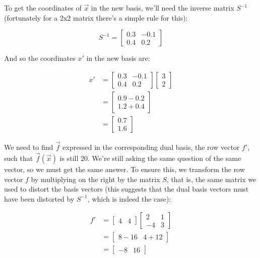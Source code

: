 To get the coordinates of $\vec{x}$ in the new basis, we'll need the inverse matrix $S^{-1}$ (fortunately for a 2x2 matrix there's a simple rule for this):

$$
S^{-1} = \begin{bmatrix}
    0.3 & -0.1 \\
    0.4 & 0.2
\end{bmatrix}
$$

And so the coordinates $x'$ in the new basis are:

\begin{equation}
\begin{split}
x' &= \begin{bmatrix}
    0.3 & -0.1 \\
    0.4 & 0.2
\end{bmatrix} \begin{bmatrix}
    3 \\ 2
\end{bmatrix} \\
  &= \begin{bmatrix}
    0.9 - 0.2 \\ 1.2 + 0.4
\end{bmatrix} \\
  &= \begin{bmatrix}
    0.7 \\ 1.6
\end{bmatrix}
\end{split}
\end{equation}

We need to find $\vec{f}$ expressed in the corresponding dual basis, the row vector $f'$, such that $\vec{f}(\vec{x})$ is still $20$. We're still asking the same question of the same vector, so we must get the same answer. To ensure this, we transform the row vector $f$ by multiplying on the right by the matrix $S$, that is, the same matrix we used to distort the basis vectors (this suggests that the dual basis vectors must have been distorted by $S^{-1}$, which is indeed the case):

\begin{equation}
\begin{split}
f' &= \begin{bmatrix}
    4 & 4
\end{bmatrix} \begin{bmatrix}
    2 & 1 \\
    -4 & 3
\end{bmatrix} \\
  &= \begin{bmatrix}
    8 - 16 & 4 + 12
\end{bmatrix} \\
  &= \begin{bmatrix}
    -8 & 16
\end{bmatrix}
\end{split}
\end{equation}

